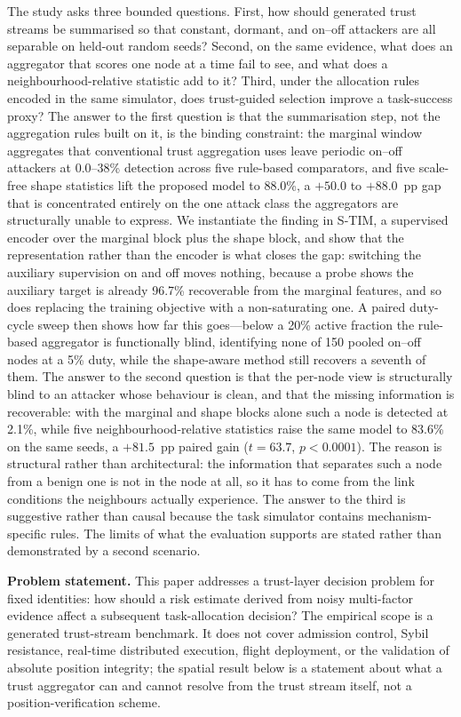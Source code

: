 \documentclass[notspecified,article,submit,moreauthors]{Definitions/mdpi}
\begin{document}
The study asks three bounded questions. First, how should generated trust streams be summarised so that constant, dormant, and on--off attackers are all separable on held-out random seeds? Second, on the same evidence, what does an aggregator that scores one node at a time fail to see, and what does a neighbourhood-relative statistic add to it? Third, under the allocation rules encoded in the same simulator, does trust-guided selection improve a task-success proxy? The answer to the first question is that the summarisation step, not the aggregation rules built on it, is the binding constraint: the marginal window aggregates that conventional trust aggregation uses leave periodic on--off attackers at 0.0--38\% detection across five rule-based comparators, and five scale-free shape statistics lift the proposed model to 88.0\%, a $+50.0$ to $+88.0$~pp gap that is concentrated entirely on the one attack class the aggregators are structurally unable to express. We instantiate the finding in S-TIM, a supervised encoder over the marginal block plus the shape block, and show that the representation rather than the encoder is what closes the gap: switching the auxiliary supervision on and off moves nothing, because a probe shows the auxiliary target is already 96.7\% recoverable from the marginal features, and so does replacing the training objective with a non-saturating one. A paired duty-cycle sweep then shows how far this goes---below a 20\% active fraction the rule-based aggregator is functionally blind, identifying none of 150 pooled on--off nodes at a 5\% duty, while the shape-aware method still recovers a seventh of them. The answer to the second question is that the per-node view is structurally blind to an attacker whose behaviour is clean, and that the missing information is recoverable: with the marginal and shape blocks alone such a node is detected at 2.1\%, while five neighbourhood-relative statistics raise the same model to 83.6\% on the same seeds, a $+81.5$~pp paired gain ($t=63.7$, $p<0.0001$). The reason is structural rather than architectural: the information that separates such a node from a benign one is not in the node at all, so it has to come from the link conditions the neighbours actually experience. The answer to the third is suggestive rather than causal because the task simulator contains mechanism-specific rules. The limits of what the evaluation supports are stated rather than demonstrated by a second scenario.

\textbf{Problem statement.}
This paper addresses a trust-layer decision problem for fixed identities: how should a risk estimate derived from noisy multi-factor evidence affect a subsequent task-allocation decision? The empirical scope is a generated trust-stream benchmark. It does not cover admission control, Sybil resistance, real-time distributed execution, flight deployment, or the validation of absolute position integrity; the spatial result below is a statement about what a trust aggregator can and cannot resolve from the trust stream itself, not a position-verification scheme.
\end{document}

